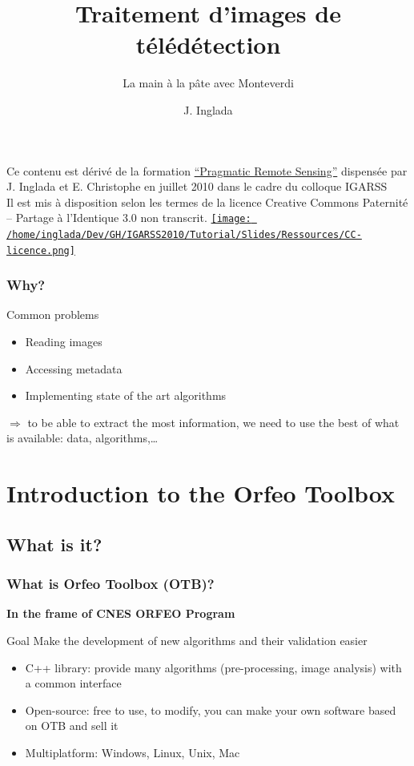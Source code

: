 \documentclass[compress]{beamer}
\title{Traitement d'images de télédétection}
\subtitle{La main à la pâte avec Monteverdi} %
\author
{J. Inglada}
\institute[Cesbio] %
{\textsc{Centre d'Études Spatiales de la Biosphère, Toulouse, France}}
\date{}
\begin{document}
\begin{frame}
  \titlepage
{\tiny Ce contenu est dérivé de la formation \href{http://www.orfeo-toolbox.org/packages/PragmaticRemoteSensing-handout.pdf}{``Pragmatic Remote
  Sensing''} dispensée par J. Inglada et E. Christophe en juillet 2010
  dans le cadre du colloque IGARSS\\

  Il est mis à disposition selon les termes de la licence
Creative Commons Paternité – Partage à l’Identique 3.0 non transcrit.} \href{http://creativecommons.org/licenses/by-sa/3.0/}{\texttt{[image: /home/inglada/Dev/GH/IGARSS2010/Tutorial/Slides/Ressources/CC-licence.png]}}
\end{frame}

\begin{frame}
\frametitle{Why?}
\begin{block}{Common problems}
\begin{itemize}
 \item Reading images
 \item Accessing metadata
 \item Implementing state of the art algorithms
\end{itemize}
\end{block}
$\Rightarrow$ to be able to \alert{extract the most information}, we
 need to \alert{use the best} of what is available: data, algorithms,\ldots
\end{frame}


\section{Introduction to the Orfeo Toolbox}



\subsection[What]{What is it?}
\begin{frame}
\frametitle{What is Orfeo Toolbox (OTB)?}

\textbf{In the frame of CNES ORFEO Program}
\begin{alertblock}{Goal}
Make the development of new algorithms and their validation easier
\end{alertblock}
\begin{block}{}
\begin{itemize}
 \item C++ library: provide many algorithms (pre-processing, image analysis) with a common interface
 \item Open-source: free to use, to modify, you can make your own software based on OTB and sell it
 \item Multiplatform: Windows, Linux, Unix, Mac
\end{itemize}
\end{block}
\end{frame}
\end{document}
